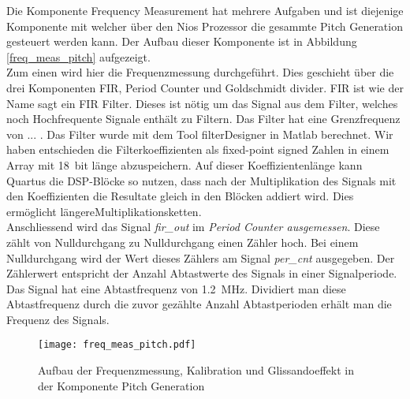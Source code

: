 Die Komponente Frequency Measurement hat mehrere Aufgaben und ist diejenige Komponente mit welcher über den Nios Prozessor die gesammte Pitch Generation gesteuert werden kann. Der Aufbau dieser Komponente ist in Abbildung \ref{freq_meas_pitch} aufgezeigt.\\
Zum einen wird hier die Frequenzmessung durchgeführt. Dies geschieht über die drei Komponenten FIR, Period Counter und Goldschmidt divider. FIR ist wie der Name sagt ein FIR Filter. Dieses ist nötig um das Signal aus dem Filter, welches noch Hochfrequente Signale enthält zu Filtern. Das Filter hat eine Grenzfrequenz von ... . Das Filter wurde mit dem Tool filterDesigner in Matlab berechnet. Wir haben entschieden die Filterkoeffizienten als fixed-point signed Zahlen in einem Array mit \SI{18}{bit} länge abzuspeichern. Auf dieser Koeffizientenlänge kann Quartus die DSP-Blöcke so nutzen, dass nach der Multiplikation des Signals mit den Koeffizienten die Resultate gleich in den Blöcken addiert wird. Dies ermöglicht längereMultiplikationsketten.  \\
Anschliessend wird das Signal \textit{fir\_out} im \textit{Period Counter ausgemessen}. Diese zählt von Nulldurchgang zu Nulldurchgang einen Zähler hoch. Bei einem Nulldurchgang wird der Wert dieses Zählers am Signal \textit{per\_cnt} ausgegeben. Der Zählerwert entspricht der Anzahl Abtastwerte des Signals in einer Signalperiode. \\
Das Signal hat eine Abtastfrequenz von \SI{1.2}{MHz}. Dividiert man diese Abtastfrequenz durch die zuvor gezählte Anzahl Abtastperioden erhält man die Frequenz des Signals.

\begin{figure}[h!]
	\centering
	\texttt{[image: freq\_meas\_pitch.pdf]}
	\caption{Aufbau der Frequenzmessung, Kalibration und Glissandoeffekt in der Komponente Pitch Generation} 
	\label{img:freq_meas_pitch}
\end{figure}  
